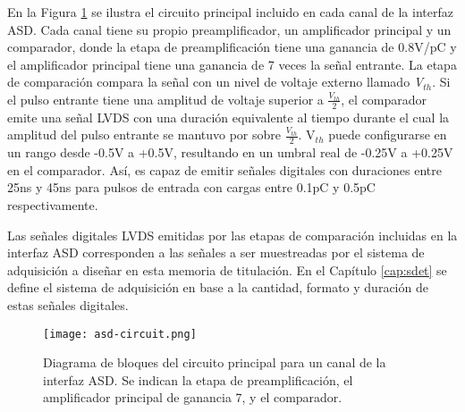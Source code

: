 En la Figura \ref{img:asd-circuit} se ilustra el circuito principal incluido en cada canal de la interfaz ASD. Cada canal tiene su propio preamplificador, un amplificador principal y un comparador\cite{1999ATLASICs}, donde la etapa de preamplificación tiene una ganancia de 0.8V/pC y el amplificador principal tiene una ganancia de 7 veces la señal entrante. La etapa de comparación compara la señal con un nivel de voltaje externo llamado \textit{V$_{th}$}. Si el pulso entrante tiene una amplitud de voltaje superior a $\frac{V_{th}}{2}$, el comparador emite una señal LVDS con una duración equivalente al tiempo durante el cual la amplitud del pulso entrante se mantuvo por sobre $\frac{V_{th}}{2}$. V$_{th}$ puede configurarse en un rango desde -0.5V a +0.5V, resultando en un umbral real de -0.25V a +0.25V en el comparador\cite{1999ATLASICs}. Así, es capaz de emitir señales digitales con duraciones entre 25ns y 45ns para pulsos de entrada con cargas entre 0.1pC y 0.5pC respectivamente.

Las señales digitales LVDS emitidas por las etapas de comparación incluidas en la interfaz ASD corresponden a las señales a ser muestreadas por el sistema de adquisición a diseñar en esta memoria de titulación. En el Capítulo \ref{cap:sdet} se define el sistema de adquisición en base a la cantidad, formato y duración de estas señales digitales.

\begin{figure}[h]
	\centering
	\texttt{[image: asd-circuit.png]}
	\caption{Diagrama de bloques del circuito principal para un canal de la interfaz ASD. Se indican la etapa de preamplificación, el amplificador principal de ganancia 7, y el comparador.}
	\label{img:asd-circuit}
\end{figure}

%
%

